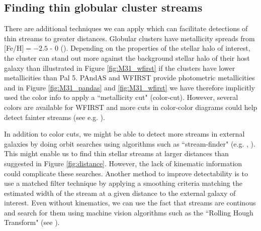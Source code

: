 \documentclass[twocolumn]{aastex62}
\begin{document}
\subsection{Finding thin globular cluster streams}
\label{sec:color}
There are additional techniques we can apply which can facilitate detections of thin streams to greater distances. Globular clusters have metallicity spreads from [Fe/H]$ = -2.5$ - 0 (\citealt{harris96}). Depending on the properties of the stellar halo of interest, the cluster can stand out more against the background stellar halo of their host galaxy than illustrated in Figure \ref{fig:M31_wfirst} if the clusters have lower metallicities than Pal 5. PAndAS and WFIRST provide photometric metallicities and in Figure \ref{fig:M31_pandas} and \ref{fig:M31_wfirst} we have therefore implicitly used the color info to apply a ``metallicity cut" (color-cut). 
However, several colors are available for WFIRST and more cuts in color-color diagrams could help detect fainter streams (see e.g. \citealt{shipp18}). 

In addition to color cuts, we might be able to detect more streams in external galaxies by doing orbit searches using algorithms such as ``stream-finder" (e.g. \citealt{malhan18}, \citealt{ibata19}). This might enable us to find thin stellar streams at larger distances than suggested in Figure \ref{fig:distance}. However, the lack of kinematic information could complicate these searches. Another method to improve detectability is to use a matched filter technique by applying a smoothing criteria matching the estimated width of the stream at a given distance to the external galaxy of interest. Even without kinematics, we can use the fact that streams are continous and search for them using machine vision algorithms such as the ``Rolling Hough Transform" (see \citealt{clark14}). 
\end{document}
